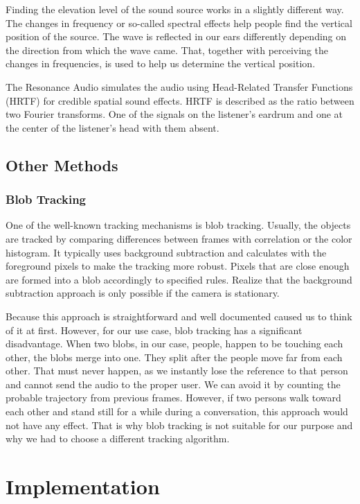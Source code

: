 \documentclass{ctuthesis}
\begin{document}
Finding the elevation level of the sound source works in a slightly different way. The changes in frequency or so-called spectral effects help people find the vertical position of the source. The wave is reflected in our ears differently depending on the direction from which the wave came. That, together with perceiving the changes in frequencies, is used to help us determine the vertical position\cite{91}.

The Resonance Audio simulates the audio using Head-Related Transfer Functions (HRTF) for credible spatial sound effects.
HRTF is described as the ratio between two Fourier transforms. One of the signals on the listener's eardrum and one at the center of the listener's head with them absent\cite{90}.

\section{Other Methods}
\subsection{Blob Tracking}
One of the well-known tracking mechanisms is blob tracking. Usually, the objects are tracked by comparing differences between frames with correlation or the color histogram. It typically uses background subtraction and calculates with the foreground pixels to make the tracking more robust. Pixels that are close enough are formed into a blob accordingly to specified rules. Realize that the background subtraction approach is only possible if the camera is stationary.

Because this approach is straightforward and well documented caused us to think of it at first. However, for our use case, blob tracking has a significant disadvantage. When two blobs, in our case, people, happen to be touching each other, the blobs merge into one. They split after the people move far from each other. That must never happen, as we instantly lose the reference to that person and cannot send the audio to the proper user. We can avoid it by counting the probable trajectory from previous frames. However, if two persons walk toward each other and stand still for a while during a conversation, this approach would not have any effect. That is why blob tracking is not suitable for our purpose and why we had to choose a different tracking algorithm.


\chapter{Implementation}
\end{document}
